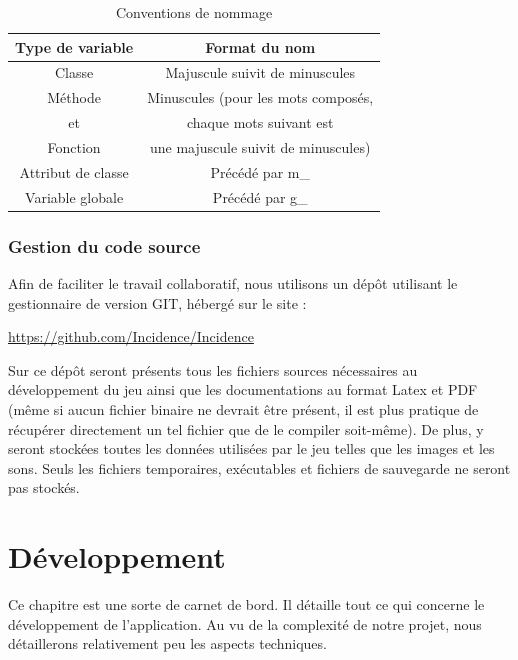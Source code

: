 \documentclass[a4paper]{memoir}
\begin{document}
				\begin{table}[H]
					\begin{small}
						\begin{tabular}{| c | c |}
							\hline
							\textbf{Type de variable} & \textbf{Format du nom}\\
							\hline
							Classe & Majuscule suivit de minuscules\\
							\hline
							Méthode & Minuscules (pour les mots composés,\\
							et & chaque mots suivant est\\
							Fonction & une majuscule suivit de minuscules)\\
							\hline
							Attribut de classe & Précédé par m\_\\
							\hline
							Variable globale & Précédé par g\_\\
							\hline
						\end{tabular}
					\end{small}
					\label{tab:nommage}
					\caption{Conventions de nommage}
				\end{table}

			\subsection{Gestion du code source}
				Afin de faciliter le travail collaboratif, nous utilisons un dépôt utilisant le gestionnaire de version GIT, hébergé sur le site :
				\begin{center}
					\url{https://github.com/Incidence/Incidence}
					\label{url:github}
				\end{center}
				Sur ce dépôt seront présents tous les fichiers sources nécessaires au développement du jeu ainsi que les documentations au format Latex et PDF (même si aucun fichier binaire ne devrait être présent, il est plus pratique de récupérer directement un tel fichier que de le compiler soit-même). De plus, y seront stockées toutes les données utilisées par le jeu telles que les images et les sons. Seuls les fichiers temporaires, exécutables et fichiers de sauvegarde ne seront pas stockés.


	\chapter{Développement}
		Ce chapitre est une sorte de carnet de bord. Il détaille tout ce qui concerne le développement de l'application. Au vu de la complexité de notre projet, nous détaillerons relativement peu les aspects techniques.
		
\end{document}
